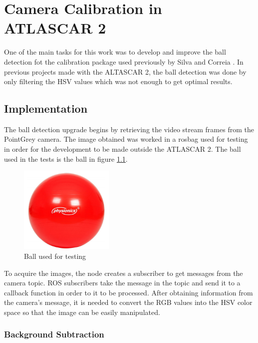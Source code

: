 \chapter{Camera Calibration in ATLASCAR 2}

One of the main tasks for this work was to develop and improve the ball detection fot the calibration package used previously by Silva \cite{VieiradaSilva2016} and Correia \cite{Correia2017}. In previous projects made with the ALTASCAR 2, the ball detection was done by only filtering the HSV values which was not enough to get optimal results.

\section{Implementation}

The ball detection upgrade begins by retrieving the video stream frames from the PointGrey camera. The image obtained was worked in a rosbag used for testing in order for the development to be made outside the ATLASCAR 2. The ball used in the tests is the ball in figure \ref{fig:ball}. 

\begin{figure}[htp]
	
	\centering
	\includegraphics[width=0.4\textwidth]{capcalib/imgs/ball.png}
	
	\caption{Ball used for testing}
	\label{fig:ball}
	
\end{figure}

To acquire the images, the node creates a subscriber to get messages from the camera topic. ROS subscribers take the message in the topic and send it to a callback function in order to it to be processed. After obtaining information from the camera's message, it is needed to convert the RGB values into the HSV color space so that the image can be easily manipulated.

\subsection{Background Subtraction}

